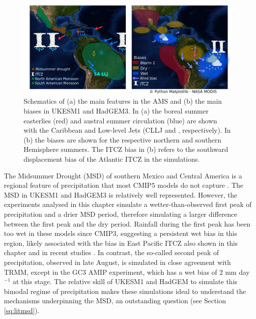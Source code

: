 \begin{figure}[t!]
\centering
 \includegraphics[width=\linewidth]{figures/drawing_d}
\caption[Summary schematic of biases in UKESM1 and HadGEM3]{Schematics of (a) the main features in the AMS and (b) the main biases in UKESM1 and HadGEM3. In (a) the boreal summer easterlies (red) and austral summer circulation (blue) are shown with the Caribbean and  Low-level Jets (CLLJ and , respectively). In (b) the biases are shown for the respective northern and southern Hemisphere summers. The ITCZ bias in (b) refers to the southward displacement bias of the Atlantic ITCZ in the simulations.  }
\label{fig:13}
\end{figure}

    The Midsummer Drought (MSD) of southern Mexico and Central America is a regional feature of precipitation that most CMIP5 models do not capture \citep{ryu2014}. 
The MSD in UKESM1 and HadGEM3 is relatively well represented. However, the experiments analysed in this chapter simulate a wetter-than-observed first peak of precipitation and a drier MSD period, therefore simulating a larger difference between the first peak and the dry period. %
Rainfall during the first peak has been too wet in these models since CMIP3, suggesting a persistent wet bias in this region, likely associated with the bias in East Pacific ITCZ also shown in this chapter and in recent studies \citep{ryu2014,mulcahy2018}. 
In contrast, the so-called second peak of precipitation, observed in late August, is simulated in close agreement with TRMM, except in the GC3 AMIP experiment, which has a wet bias of 2 mm day$^{-1}$ at this stage. The relative skill of UKESM1 and HadGEM to simulate this bimodal regime of precipitation makes these simulations ideal to understand the mechanisms underpinning the MSD, an outstanding question (see Section \ref{sq:litmsd}).  



